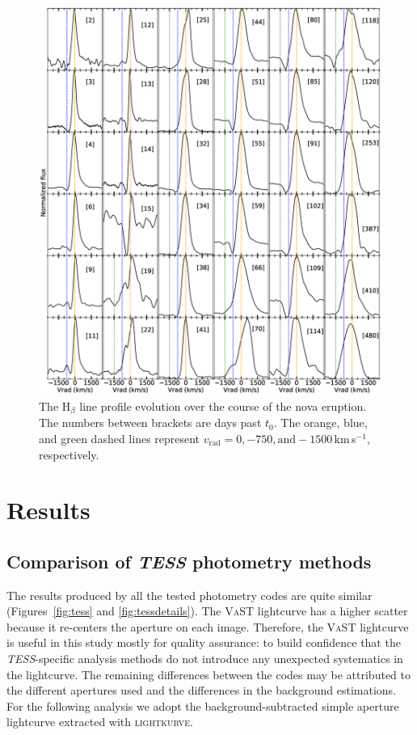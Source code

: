 \documentclass[twocolumn]{aastex631}
\begin{document}
%
\begin{figure}
\centering
        \includegraphics[width=1.0\textwidth,clip=true,trim=0cm 0cm 0cm 0cm,angle=0]{V606_Hbeta_line_profiles.eps}
\caption{The H$_\beta$ line profile evolution over the course of the nova eruption. The numbers between brackets are days past $t_0$. The orange, blue, and green dashed lines represent $v_{\mathrm{rad}}= 0, -750, \mathrm{and} -1500$\,km\,s$^{-1}$, respectively.}
    \label{fig:hbetaprofile}
\end{figure}




\section{Results}
\label{sec:results}

\subsection{Comparison of {\em TESS} photometry methods}
\label{sec:codecomparison}

The results produced by all the tested photometry codes are quite similar
(Figures~\ref{fig:tess} and \ref{fig:tessdetails}). 
The \textsc{VaST} lightcurve has a higher scatter because 
it re-centers the aperture on each image. Therefore, the \textsc{VaST} lightcurve 
is useful in this study mostly for quality assurance: to build confidence that 
the {\em TESS}-specific analysis methods do not introduce any unexpected systematics in the lightcurve. 
The remaining differences between the codes may be attributed to the 
different apertures used and the differences in the background estimations.
For the following analysis we adopt the background-subtracted 
simple aperture lightcurve extracted with \textsc{lightkurve}.
\end{document}
